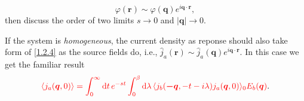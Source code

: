 \documentclass[10pt,nofootinbib,letterpaper]{revtex4}
\newcommand*\dd{\mathop{}\!\mathrm{d}}
\begin{document}
		\begin{equation}\label{1.2.4}
			\varphi(\bm{r})\sim\varphi(\bm{q})e^{i\bm{q\cdot r}},
		\end{equation}
		then discuss the order of two limits $s\rightarrow0$ and $|\bm{q}|\rightarrow0$.\par
		If the system is \emph{homogeneous}, the current density as reponse should also take form of \eqref{1.2.4} as the source fields do, i.e., $\hat{j}_a(\bm{r})\sim\hat{j}_a(\bm{q})e^{i\bm{q\cdot r}}$. In this case we get the familiar result
		\begin{equation}\label{1.2.5}
			{\color{red}\langle j_a(\bm{q},0)\rangle=\int_0^\infty\dd t\,e^{-st}\int_0^\beta\dd\lambda\,\langle j_b(\bm{-q},-t-i\lambda)j_a(\bm{q},0)\rangle_0 E_b(\bm{q})}.
		\end{equation}
	
\end{document}
